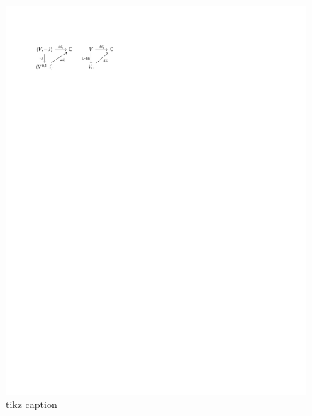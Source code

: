 \documentclass[11pt]{article}
\begin{document}
\begin{figure}[htbp]
\centering
\includegraphics[width=.9\linewidth]{../img/fsa.pdf}
\caption{\label{fig:orgb175db8}
tikz caption}
\end{figure}
\end{document}
